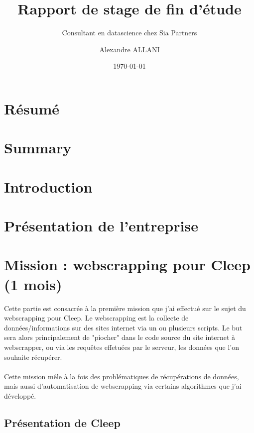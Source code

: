 \documentclass{article} %
\author{Alexandre ALLANI}
\date{\noexpand\today} %
\title{Rapport de stage de fin d'étude}
\subtitle{Consultant en datascience chez Sia Partners}
\begin{document}
\imtaMaketitlepage

\section{Résumé}
\newpage

\section{Summary}
\newpage



\tableofcontents
\newpage


\section{Introduction}
\newpage

\section{Présentation de l'entreprise}
\newpage

\section{Mission : webscrapping pour Cleep (1 mois)}
Cette partie est consacrée à la première mission que j'ai effectué sur le sujet du webscrapping pour Cleep. Le webscrapping est la collecte de données/informations sur des sites internet via un ou plusieurs scripts. Le but sera alors principalement de "piocher" dans le code source du site internet à webscrapper, ou via les requêtes effetuées par le serveur, les données que l'on souhaite récupérer.\\ \\
Cette mission mêle à la fois des problématiques de récupérations de données, mais aussi d'automatisation de webscrapping via certains algorithmes que j'ai développé.

\subsection{Présentation de Cleep}
\end{document}
